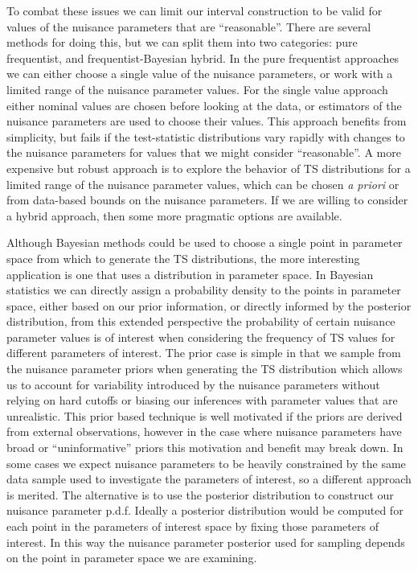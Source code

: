 To combat these issues we can limit our interval construction to be valid for values of the nuisance parameters that are ``reasonable''.
There are several methods for doing this, but we can split them into two categories: pure frequentist, and frequentist-Bayesian hybrid.
In the pure frequentist approaches we can either choose a single value of the nuisance parameters, or work with a limited range of the nuisance parameter values.
For the single value approach either nominal values are chosen before looking at the data, or estimators of the nuisance parameters are used to choose their values.
This approach benefits from simplicity, but fails if the test-statistic distributions vary rapidly with changes to the nuisance parameters for values that we might consider ``reasonable''.
A more expensive but robust approach is to explore the behavior of TS distributions for a limited range of the nuisance parameter values, which can be chosen {\it a priori} or from data-based bounds on the nuisance parameters.
If we are willing to consider a hybrid approach, then some more pragmatic options are available.

Although Bayesian methods could be used to choose a single point in parameter space from which to generate the TS distributions, the more interesting application is one that uses a distribution in parameter space.
In Bayesian statistics we can directly assign a probability density to the points in parameter space, either based on our prior information, or directly informed by the posterior distribution, from this extended perspective the probability of certain nuisance parameter values is of interest when considering the frequency of TS values for different parameters of interest.
The prior case is simple in that we sample from the nuisance parameter priors when generating the TS distribution which allows us to account for variability introduced by the nuisance parameters without relying on hard cutoffs or biasing our inferences with parameter values that are unrealistic.
This prior based technique is well motivated if the priors are derived from external observations, however in the case where nuisance parameters have broad or ``uninformative'' priors this motivation and benefit may break down.
In some cases we expect nuisance parameters to be heavily constrained by the same data sample used to investigate the parameters of interest, so a different approach is merited.
The alternative is to use the posterior distribution to construct our nuisance parameter p.d.f.
Ideally a posterior distribution would be computed for each point in the parameters of interest space by fixing those parameters of interest.
In this way the nuisance parameter posterior used for sampling depends on the point in parameter space we are examining.

